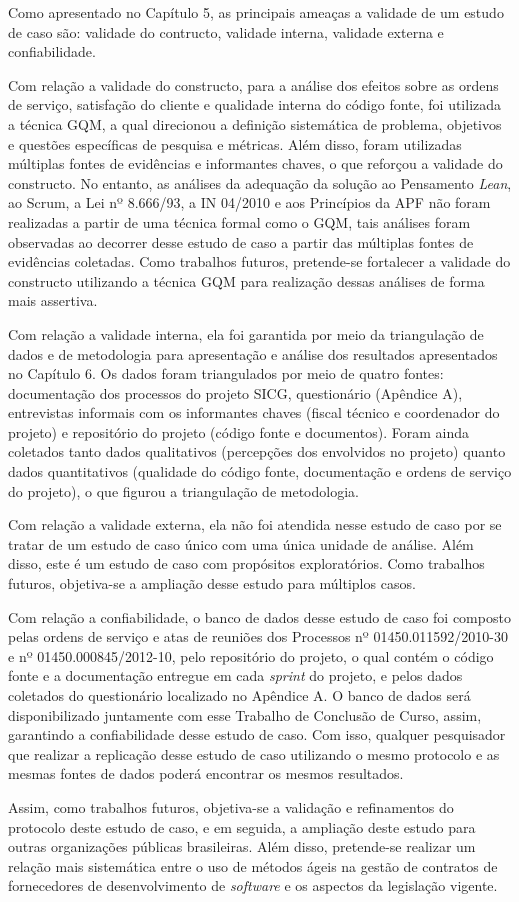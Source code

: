 Como apresentado no Capítulo 5, as principais ameaças a validade de um estudo de caso são: validade do contructo, validade interna, validade externa e confiabilidade. 

Com relação a validade do constructo, para a análise dos efeitos sobre as ordens de serviço, satisfação do cliente e qualidade interna do código fonte, foi utilizada a técnica GQM, a qual direcionou a definição sistemática de problema, objetivos e questões específicas de pesquisa e métricas. Além disso, foram utilizadas múltiplas fontes de evidências e informantes chaves, o que reforçou a validade do constructo. No entanto, as análises da adequação da solução ao Pensamento \textit{Lean}, ao Scrum, a Lei nº 8.666/93, a IN 04/2010 e aos Princípios da APF não foram realizadas a partir de uma técnica formal como o GQM, tais análises foram observadas ao decorrer desse estudo de caso a partir das múltiplas fontes de evidências coletadas. Como trabalhos futuros, pretende-se fortalecer a validade do constructo utilizando a técnica GQM para realização dessas análises de forma mais assertiva.

Com relação a validade interna, ela foi garantida por meio da triangulação de dados e de metodologia para apresentação e análise dos resultados apresentados no Capítulo 6. Os dados foram triangulados por meio de quatro fontes: documentação dos processos do projeto SICG, questionário (Apêndice A), entrevistas informais com os informantes chaves (fiscal técnico e coordenador do projeto) e repositório do projeto (código fonte e documentos). Foram ainda coletados tanto dados qualitativos (percepções dos envolvidos no projeto) quanto dados quantitativos (qualidade do código fonte, documentação e ordens de serviço do projeto), o que figurou a triangulação de metodologia.

Com relação a validade externa,  ela não foi atendida nesse estudo de caso por se tratar de um estudo de caso único com uma única unidade de análise. Além disso, este é um estudo de caso com propósitos exploratórios. Como trabalhos futuros, objetiva-se a ampliação desse estudo para múltiplos casos.

Com relação a confiabilidade, o banco de dados desse estudo de caso foi composto pelas ordens de serviço e atas de reuniões dos Processos nº 01450.011592/2010-30 e nº 01450.000845/2012-10, pelo repositório do projeto, o qual contém o código fonte e a documentação entregue em cada \textit{sprint} do projeto, e pelos dados coletados do questionário localizado no Apêndice A. O banco de dados será disponibilizado juntamente com esse Trabalho de Conclusão de Curso, assim, garantindo a confiabilidade desse estudo de caso. Com isso, qualquer pesquisador que realizar a replicação desse estudo de caso utilizando o mesmo protocolo e as mesmas fontes de dados poderá encontrar os mesmos resultados.
 
Assim, como trabalhos futuros, objetiva-se a validação e refinamentos do protocolo deste estudo de caso, e em seguida, a ampliação deste estudo para outras organizações públicas brasileiras. Além disso, pretende-se realizar um relação mais sistemática entre o uso de métodos ágeis na gestão de contratos de fornecedores de desenvolvimento de \textit{software} e os aspectos da legislação vigente.
 